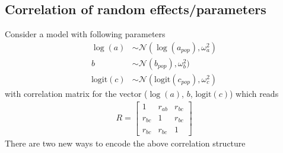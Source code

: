 \subsection{Correlation of random effects/parameters}

Consider a model with following parameters
\begin{align}
\log(a) &\sim \mathcal{N}(\log(a_{pop}), \omega_a^2) \nonumber \\
b &\sim \mathcal{N}(b_{pop}), \omega_b^2) \nonumber \\
\mbox{logit}(c) &\sim \mathcal{N}(\mbox{logit}(c_{pop}), \omega_c^2) \nonumber 
\end{align}
with correlation matrix for the vector ($\log(a)$, $b$, $\text{logit}(c)$) which reads
\begin{align}
R = 
\begin{bmatrix} 1 & r_{ab} & r_{bc}  \\
 r_{bc} &  1 & r_{bc} \\
 r_{bc} & r_{bc} & 1 \nonumber
 \end{bmatrix}
\end{align}
\smallskip
There are two new ways to encode the above correlation structure

